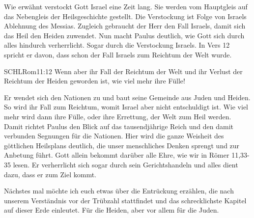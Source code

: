         \begin{otsblock}[Fazit]
        Wie erwähnt verstockt Gott Israel eine Zeit lang. Sie werden vom Hauptgleis auf das Nebengleis der Heilsgeschichte gestellt. Die Verstockung ist Folge von Israels Ablehnung des Messias. Zugleich gebraucht der Herr den Fall Israels, damit sich das Heil den Heiden zuwendet. Nun macht Paulus deutlich, wie Gott sich durch alles hindurch verherrlicht. Sogar durch die Verstockung Israels. In Vers 12 spricht er davon, dass schon der Fall Israels zum Reichtum der Welt wurde. 
        \begin{bibelbox}{SCHL}{Rom}{11:12}
            Wenn aber ihr Fall der Reichtum der Welt und ihr Verlust der Reichtum der Heiden geworden ist, wie viel mehr ihre Fülle!
        \end{bibelbox}
        Er wendet sich den Nationen zu und baut seine Gemeinde aus Juden und Heiden. So wird ihr Fall zum Reichtum, womit Israel aber nicht entschuldigt ist. Wie viel mehr wird dann ihre Fülle, oder ihre Errettung, der Welt zum Heil werden. Damit richtet Paulus den Blick auf das tausendjährige Reich und den damit verbunden Segnungen für die Nationen. Hier wird die ganze Weisheit des göttlichen Heilsplans deutlich, die unser menschliches Denken sprengt und zur Anbetung führt. Gott allein bekommt darüber alle Ehre, wie wir in Römer 11,33-35 lesen. Er verherrlicht sich sogar durch sein Gerichtshandeln und alles dient dazu, dass er zum Ziel kommt.
    \end{otsblock}

    Nächstes mal möchte ich euch etwas über die Entrückung erzählen, die nach unserem Verständnis vor der Trübzahl stattfindet und das schrecklichste Kapitel auf dieser Erde einleutet. Für die Heiden, aber vor allem für die Juden.